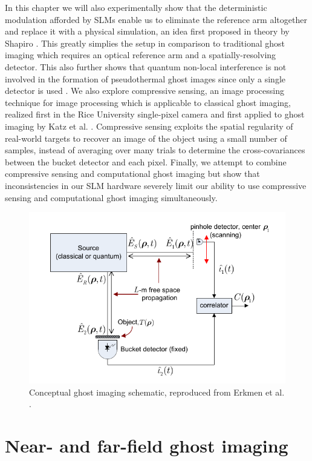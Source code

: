 In this chapter we will also experimentally show that the deterministic modulation afforded by SLMs enable us to eliminate the reference arm altogether and replace it with a physical simulation, an idea first proposed in theory by Shapiro \cite{shapiro-computational}. This greatly simplies the setup in comparison to traditional ghost imaging which requires an optical reference arm and a spatially-resolving detector. This also further shows that quantum non-local interference is not involved in the formation of pseudothermal ghost images since only a single detector is used \cite{shapiro-discord}. We also explore compressive sensing, an image processing technique for image processing which is applicable to classical ghost imaging, realized first in the Rice University single-pixel camera \cite{takhar-new,duarte-single} and first applied to ghost imaging by Katz et al. \cite{katz-compressive}. Compressive sensing exploits the spatial regularity of real-world targets to recover an image of the object using a small number of samples, instead of averaging over many trials to determine the cross-covariances between the bucket detector and each pixel. Finally, we attempt to combine compressive sensing and computational ghost imaging but show that inconsistencies in our SLM hardware severely limit our ability to use compressive sensing and computational ghost imaging simultaneously.

\begin{figure}[htb]
\centerline{\includegraphics[width=12cm]{figure-ghost-schematic.pdf}}
\caption{Conceptual ghost imaging schematic, reproduced from Erkmen et al. \cite{erkmen-unified}.}
\label{figure:ghost-schematic}
\end{figure}

\section{Near- and far-field ghost imaging}

